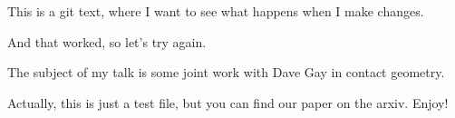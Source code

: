 \documentclass[11pt]{amsart}
\theoremstyle{plain}
\theoremstyle{definition}
\theoremstyle{remark}
\numberwithin{equation}{section}
\begin{document}
This is a git text, where I want to see what happens when I make changes.

And that worked, so let's try again.

The subject of my talk is some joint work with Dave Gay in contact geometry.

Actually, this is just a test file, but you can find our paper on the arxiv. Enjoy!
\end{document}
